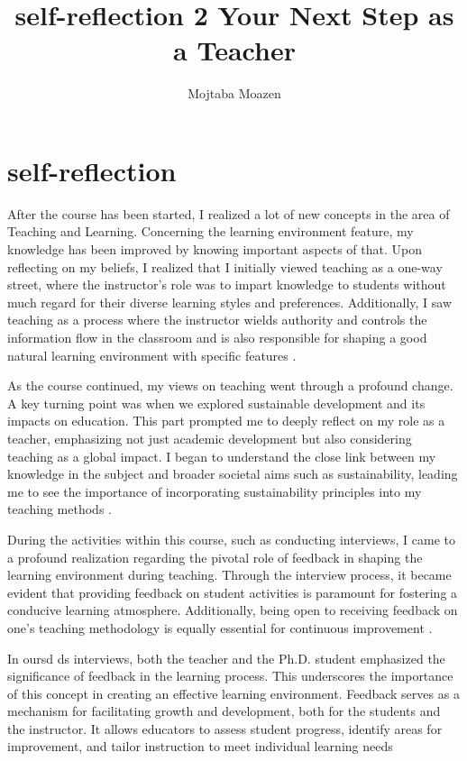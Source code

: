 \documentclass[12pt,a4paper]{article}
\title{self-reflection 2 Your Next Step as a Teacher}
\author{Mojtaba Moazen}
\begin{document}
\maketitle
\section{self-reflection}
After the course has been started, I realized a lot of new concepts in the area of Teaching and Learning. Concerning the learning environment feature, my knowledge has been improved by knowing important aspects of that. Upon reflecting on my beliefs, I realized that I initially viewed teaching as a one-way street, where the instructor's role was to impart knowledge to students without much regard for their diverse learning styles and preferences. Additionally, I saw teaching as a process where the instructor wields authority and controls the information flow in the classroom and is also responsible for shaping a good natural learning environment with specific features \cite{ain2011best}. 

As the course continued, my views on teaching went through a profound change. A key turning point was when we explored sustainable development and its impacts on education. This part prompted me to deeply reflect on my role as a teacher, emphasizing not just academic development but also considering teaching as a global impact. I began to understand the close link between my knowledge in the subject and broader societal aims such as sustainability, leading me to see the importance of incorporating sustainability principles into my teaching methods \cite{wiek2011key}.


During the activities within this course, such as conducting interviews, I came to a profound realization regarding the pivotal role of feedback in shaping the learning environment during teaching. Through the interview process, it became evident that providing feedback on student activities is paramount for fostering a conducive learning atmosphere. Additionally, being open to receiving feedback on one's teaching methodology is equally essential for continuous improvement \cite{timperley2007power}.

In oursd ds  interviews, both the teacher and the Ph.D. student emphasized the significance of feedback in the learning process. This underscores the importance of this concept in creating an effective learning environment. Feedback serves as a mechanism for facilitating growth and development, both for the students and the instructor. It allows educators to assess student progress, identify areas for improvement, and tailor instruction to meet individual learning needs
\end{document}
